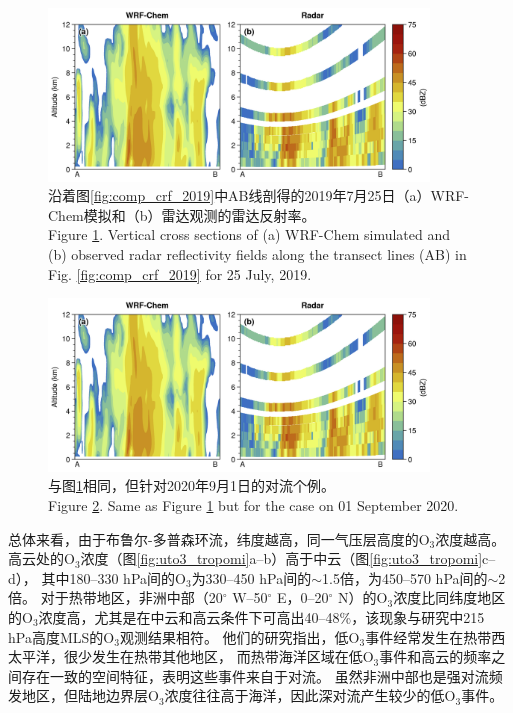 \begin{figure}[H]
\centering
\includegraphics[width=0.9\textwidth]{./figures/comp_dbzcross_2019.png}
\caption{沿着图\ref{fig:comp_crf_2019}中AB线剖得的2019年7月25日（a）WRF-Chem模拟和（b）雷达观测的雷达反射率。\\
Figure \ref{fig:comp_dbzcross_2019}. Vertical cross sections of (a) WRF-Chem simulated and (b) observed radar reflectivity fields along the transect lines (AB) in Fig. \ref{fig:comp_crf_2019} for 25 July, 2019.}
\label{fig:comp_dbzcross_2019}
\end{figure}

\begin{figure}[H]
\centering
\includegraphics[width=0.9\textwidth]{./figures/comp_dbzcross_2019.png}
\caption{与图\ref{fig:comp_dbzcross_2019}相同，但针对2020年9月1日的对流个例。\\
Figure \ref{fig:comp_dbzcross_2020}. Same as Figure \ref{fig:comp_dbzcross_2019} but for the case on 01 September 2020.}
\label{fig:comp_dbzcross_2020}
\end{figure}

总体来看，由于布鲁尔-多普森环流，纬度越高，同一气压层高度的O$_3$浓度越高。
高云处的O$_3$浓度（图\ref{fig:uto3_tropomi}a--b）高于中云（图\ref{fig:uto3_tropomi}c--d），
其中180--330 hPa间的O$_3$为330--450 hPa间的$\sim$1.5倍，为450--570 hPa间的$\sim$2倍。
对于热带地区，非洲中部（20$^{\circ}$ W--50$^{\circ}$ E，0--20$^{\circ}$ N）的O$_3$浓度比同纬度地区的O$_3$浓度高，尤其是在中云和高云条件下可高出40--48\%，该现象与\citet{Cooper.2013}研究中215 hPa高度MLS的O$_3$观测结果相符。
他们的研究指出，低O$_3$事件经常发生在热带西太平洋，很少发生在热带其他地区，
而热带海洋区域在低O$_3$事件和高云的频率之间存在一致的空间特征，表明这些事件来自于对流。
虽然非洲中部也是强对流频发地区，但陆地边界层O$_3$浓度往往高于海洋，因此深对流产生较少的低O$_3$事件。

